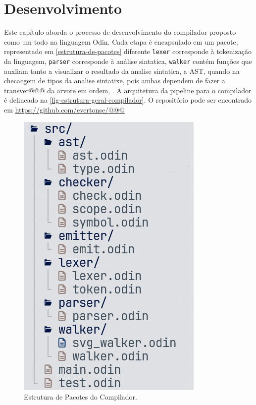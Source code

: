 
\chapter{Desenvolvimento}

Este capítulo aborda o processo de desenvolvimento do compilador proposto como um todo na linguagem Odin.
Cada etapa é encapsulado em um pacote, representado em \autoref{estrutura-de-pacotes} diferente \texttt{lexer} corresponde à tokenização da linguagem, \texttt{parser} corresponde à análise sintatica, \texttt{walker} contém funções que auxliam tanto a visualizar o resultado da analise sintatica, a AST, quando na checacgem de tipos da analise sintatixe, pois ambas dependem de fazer a transver@@@ da arvore em ordem, 
\texttt{}. A arquitetura da pipeline para o compilador é delineado na \autoref{fig-estrutura-geral-compilador}.
O repositório pode ser encontrado em \url{https://github.com/evertonse/@@@}

\begin{figure}[H]
  \caption{\label{estrutura-de-pacotes} \small Estrutura de Pacotes do Compilador.}
  \begin{center}
    \includegraphics[scale=0.5]{./Imagens/package-structure.png}
  \end{center}
\end{figure}

